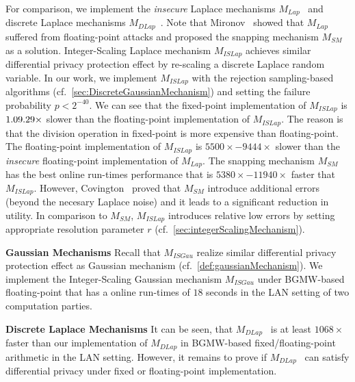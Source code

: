 For comparison, we implement the \textit{insecure} Laplace mechanisms $M_{Lap}$~\cite{eigner2014differentially} and discrete Laplace mechanisms $M_{DLap}$~\cite{eigner2014differentially}.
Note that Mironov~\cite{mironov2014differentially} showed that $M_{Lap}$~\cite{eigner2014differentially} suffered from floating-point attacks and proposed the snapping mechanism $M_{SM}$ as a solution.
Integer-Scaling Laplace mechanism $M_{ISLap} $ achieves similar differential privacy protection effect by re-scaling a discrete Laplace random variable. In our work, we implement $M_{ISLap} $ with the rejection sampling-based algorithms (cf.~\autoref{sec:DiscreteGaussianMechanism}) and setting the failure probability $p<2^{-40}$.
We can see that the fixed-point implementation of $M_{ISLap}$ is $1.09\time-1.29\times$ slower than the floating-point implementation of $M_{ISLap}$.
The reason is that the division operation in fixed-point is more expensive than floating-point.
The floating-point implementation of $M_{ISLap}$ is $5500\times-9444\times$ slower than the \textit{insecure} floating-point implementation of $M_{Lap}$.
The snapping mechanism $M_{SM}$ has the best online run-times performance that is $5380\times-11940\times $ faster that $M_{ISLap}$.
However, Covington~\cite{Covington2019} proved that $M_{SM}$ introduce additional errors (beyond the necesary Laplace noise) and it leads to a significant reduction in utility.
In comparison to $M_{SM}$, $M_{ISLap}$ introduces relative low errors by setting appropriate resolution parameter $r$ (cf.~\autoref{sec:integerScalingMechanism}).

\textbf{Gaussian Mechanisms}
Recall that $M_{ISGau}$ realize similar differential privacy protection effect as Gaussian mechanism (cf.~\autoref{def:gaussianMechanism}).
We implement the Integer-Scaling Gaussian mechanism $M_{ISGau}$ under BGMW-based floating-point that has a online run-times of $18$ seconds in the LAN setting of two computation parties.

\textbf{Discrete Laplace Mechanisms}
It can be seen, that $M_{DLap}$~\cite{eigner2014differentially} is at least $1068\times$ faster than our implementation of $M_{DLap}$ in BGMW-based fixed/floating-point arithmetic in the LAN setting. However, it remains to prove if $M_{DLap}$~\cite{eigner2014differentially} can satisfy differential privacy under fixed or floating-point implementation.




